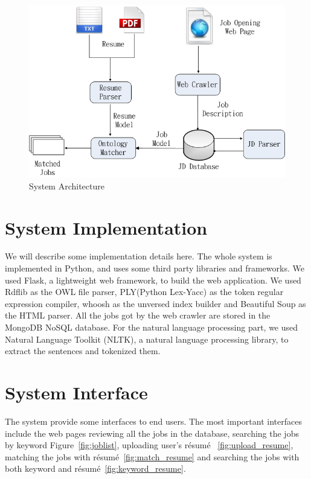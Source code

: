 \begin{figure}[htbp]
  \centering
  \includegraphics[scale=0.5]{images/arch.png}
  \caption{System Architecture}
  \label{fig:arch}
\end{figure}

\section{System Implementation}

We will describe some implementation details here. The whole system is implemented in Python, and uses some third party libraries and frameworks. We used Flask, a lightweight web framework, to build the web application. We used Rdflib as the OWL file parser, PLY(Python Lex-Yacc) as the token regular expression compiler, whoosh as the unversed index builder and Beautiful Soup as the HTML parser.  All the jobs got by the web crawler are stored in the MongoDB NoSQL database.  For the natural language processing part, we used Natural Language Toolkit (NLTK), a  natural language processing library, to extract the sentences and tokenized them.

\section{System Interface}

The system provide some interfaces to end users. The most important interfaces include the web pages reviewing all the jobs in the database, searching the jobs by keyword Figure~\ref{fig:joblist},  uploading user's r\'esum\'e ~\ref{fig:upload_resume},  matching the jobs with r\'esum\'e~\ref{fig:match_resume} and searching the jobs with both keyword and r\'esum\'e~\ref{fig:keyword_resume}.

